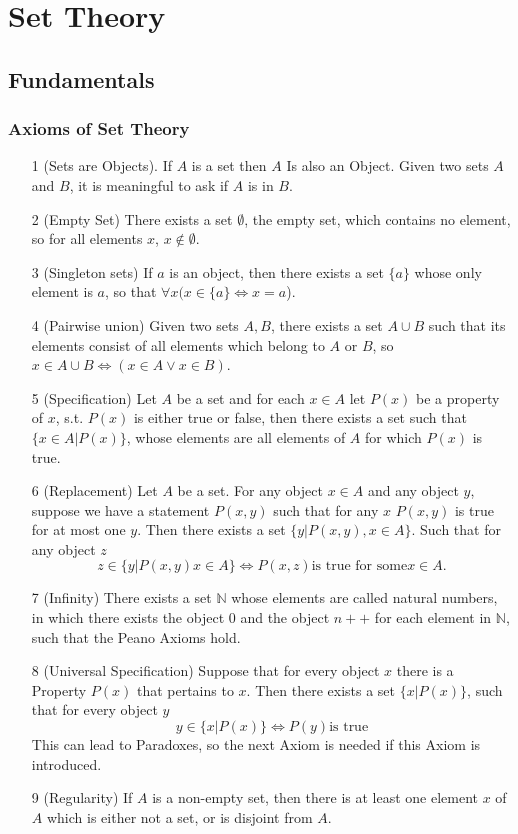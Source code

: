 

\chapter{Set Theory}

\section{Fundamentals}
\subsection{Axioms of Set Theory}
\begin{itemize}
	\item[1] (Sets are Objects). If $A$ is a set then $A$ Is also an Object. Given two sets $A$ and $B$, it is meaningful to ask if $A$ is in $B$.
	\item[2] (Empty Set) There exists a set $\emptyset$, the empty set, which contains no element, so for all elements $x$, $x\notin\emptyset$.
	\item[3] (Singleton sets) If $a$ is an object, then there exists a set $\{a\}$ whose only element is $a$, so that $\forall x(x \in \{a\} \Leftrightarrow x = a$).
	\item[4] (Pairwise union) Given two sets $A, B$, there exists a set $A\cup B$ such that its elements consist of all elements which belong to $A$ or $B$, so $x \in A\cup B \Leftrightarrow (x\in A\vee x\in B)$.
	\item[5] (Specification) Let $A$ be a set and for each $x\in A$ let $P(x)$ be a property of $x$, s.t. $P(x)$ is either true or false, then there exists a set such that $\{x\in A | P(x)\}$, whose elements are all elements of $A$ for which $P(x)$ is true.
	\item[6] (Replacement) Let $A$ be a set. For any object $x\in A$ and any object $y$, suppose we have a statement $P(x,y)$ such that for any $x$ $P(x,y)$ is true for at most one $y$. Then there exists a set $\{y| P(x,y) , x\in A\}$. Such that for any object $z$
	\begin{equation*}
		z\in\{y | P(x,y) x\in A\} \Leftrightarrow P(x,z) \text{is true for some} x\in A.
	\end{equation*}
	\item[7] (Infinity) There exists a set $\mathbb{N}$ whose elements are called natural numbers, in which there exists the object $0$ and the object $n++$ for each element in $\mathbb{N}$, such that the Peano Axioms hold.
	\item[8] (Universal Specification) Suppose that for every object $x$ there is a Property $P(x)$ that pertains to $x$. Then there exists a set $\{x | P(x)\}$, such that for every object $y$
		\begin{equation}
			y\in\{x | P(x)\} \Leftrightarrow P(y) \text{is true}
		\end{equation}
	This can lead to Paradoxes, so the next Axiom is needed if this Axiom is introduced.
	\item[9] (Regularity) If $A$ is a non-empty set, then there is at least one element $x$ of $A$ which is either not a set, or is disjoint from $A$.
\end{itemize}


